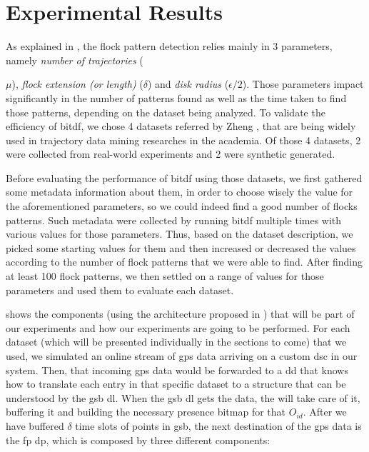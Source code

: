 \chapter{Experimental Results}
\label{chp:results}
As explained in , the flock pattern detection relies mainly in 3 parameters, namely
\textit{number of trajectories} ({$\mu$), \textit{flock extension (or length)} ($\delta$) and \textit{disk radius}
($\epsilon/2$). Those parameters impact significantly in the number of patterns found as well as the time taken to find
those patterns, depending on the dataset being analyzed. To validate the efficiency of \ac{bitdf}, we chose 4 datasets
referred by Zheng \citep{survey}, that are being widely used in trajectory data mining researches in the academia. Of
those 4 datasets, 2 were collected from real-world experiments and 2 were synthetic generated.

Before evaluating the performance of \ac{bitdf} using those datasets, we first gathered some metadata information about
them, in order to choose wisely the value for the aforementioned parameters, so we could indeed find a good number of
flocks patterns. Such metadata were collected by running \ac{bitdf} multiple times with various values for those
parameters. Thus, based on the dataset description, we picked some starting values for them and then increased or
decreased the values according to the number of flock patterns that we were able to find. After finding at least 100
flock patterns, we then settled on a range of values for those parameters and used them to evaluate each dataset.

 shows the components (using the architecture proposed in ) that
will be part of our experiments and how our experiments are going to be performed. For each dataset (which will be
presented individually in the sections to come) that we used, we simulated an online stream of \ac{gps} data arriving on
a custom \ac{dsc} in our system. Then, that incoming \ac{gps} data would be forwarded to a \ac{dd} that knows how to
translate each entry in that specific dataset to a structure that can be understood by the \ac{gsb} \ac{dl}. When the
\ac{gsb} \ac{dl} gets the data, the  will take care of it, buffering it and building the necessary
presence bitmap for that $O_{id}$. After we have buffered $\delta$ time slots of points in \ac{gsb}, the next
destination of the \ac{gps} data is the \ac{fp} \ac{dp}, which is composed by three different components:

}
